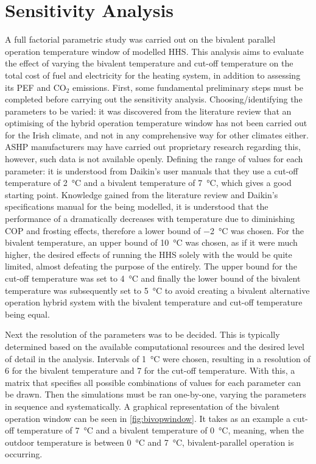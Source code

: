 \section{Sensitivity Analysis}\label{sec:sensanal}
A full factorial parametric study was carried out on the bivalent parallel operation temperature window of modelled \ac{HHS}. This analysis aims to evaluate the effect of varying the bivalent temperature and cut-off temperature on the total cost of fuel and electricity for the heating system, in addition to assessing its \ac{PEF} and $\text{CO}_2$ emissions. First, some fundamental preliminary steps must be completed before carrying out the sensitivity analysis. Choosing/identifying the parameters to be varied: it was discovered from the literature review that an optimising of the hybrid operation temperature window has not been carried out for the Irish climate, and not in any comprehensive way for other climates either. \ac{ASHP} manufacturers may have carried out proprietary research regarding this, however, such data is not available openly. Defining the range of values for each parameter: it is understood from Daikin's user manuals that they use a cut-off temperature of \qty{2}{\celsius} and a bivalent temperature of \qty{7}{\celsius}, which gives a good starting point. Knowledge gained from the literature review and Daikin's specifications manual for the \HP being modelled, it is understood that the performance of a \HP dramatically decreases with temperature due to diminishing \ac{COP} and frosting effects, therefore a lower bound of \qty{-2}{\celsius} was chosen. For the bivalent temperature, an upper bound of \qty{10}{\celsius} was chosen, as if it were much higher, the desired effects of running the \ac{HHS} solely with the \HP would be quite limited, almost defeating the purpose of the \HP entirely. The upper bound for the cut-off temperature was set to \qty{4}{\celsius} and finally the lower bound of the bivalent temperature was subsequently set to \qty{5}{\celsius} to avoid creating a bivalent alternative operation hybrid system with the bivalent temperature and cut-off temperature being equal.

Next the resolution of the parameters was to be decided. This is typically determined based on the available computational resources and the desired level of detail in the analysis. Intervals of \qty{1}{\celsius} were chosen, resulting in a resolution of 6 for the bivalent temperature and 7 for the cut-off temperature. With this, a matrix that specifies all possible combinations of values for each parameter can be drawn. Then the simulations must be ran one-by-one, varying the parameters in sequence and systematically. A graphical representation of the bivalent operation window can be seen in \cref{fig:bivopwindow}. It takes as an example a cut-off temperature of \qty{7}{\celsius} and a bivalent temperature of \qty{0}{\celsius}, meaning, when the outdoor temperature is between \qty{0}{\celsius} and \qty{7}{\celsius}, bivalent-parallel operation is occurring.

